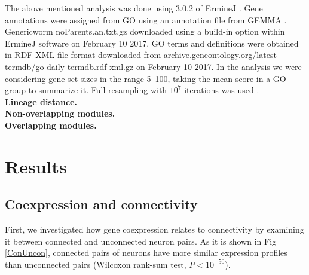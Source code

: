 \documentclass[10pt,letterpaper]{article}
\begin{document}
The above mentioned analysis was done using 3.0.2 of ErmineJ \cite{Gillis2010}. 
Gene annotations were assigned from GO \cite{Ashburner2000} using an annotation file from GEMMA \cite{Zoubarev2012}.  
Generic\textunderscore worm \textunderscore noParents.an.txt.gz downloaded using a build-in option within ErmineJ software on February 10 2017. 
GO terms and definitions were obtained in RDF XML file format downloaded from \href{archive.geneontology.org/latest-termdb/go _daily-termdb.rdf-xml.gz}{archive.geneontology.org/latest-termdb/go \textunderscore daily-termdb.rdf-xml.gz} on February 10 2017. 
In the analysis we were considering gene set sizes in the range 5–100, taking the mean score in a GO group to summarize it.
Full resampling with $10^{7}$ iterations was used . \\
\textbf{Lineage distance.}\\
\textbf{Non-overlapping modules.}\\
\textbf{Overlapping modules.}




\section*{Results}

\subsection*{Coexpression and connectivity}

First, we investigated how gene coexpression relates to connectivity by examining it between connected and unconnected neuron pairs.
As it is shown in Fig \ref{ConUncon}, connected pairs of neurons have more similar expression profiles than unconnected pairs (Wilcoxon rank-sum test, $P < 10^{-50}$).\\
\end{document}
